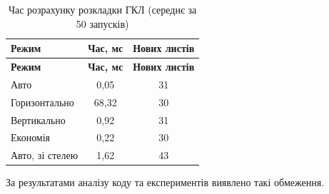 \begin{spacing}{1.15}
\small\noindent
\begin{xltabular}{\textwidth}{| >{\raggedright\arraybackslash}X | c | c |}
    \caption{Час розрахунку розкладки ГКЛ (середнє за 50 запусків)} \label{tab:perf} \\
    \hline
    \textbf{Режим} & \textbf{Час, мс} & \textbf{Нових листів} \\ \hline
    \endfirsthead

    \hline
    \textbf{Режим} & \textbf{Час, мс} & \textbf{Нових листів} \\ \hline
    \endhead

    Авто & 0,05 & 31 \\ \hline
    Горизонтально & 68,32 & 30 \\ \hline
    Вертикально & 0,92 & 31 \\ \hline
    Економія & 0,22 & 30 \\ \hline
    Авто, зі стелею & 1,62 & 43 \\ \hline
\end{xltabular}
\end{spacing}


За результатами аналізу коду та експериментів виявлено такі обмеження.

